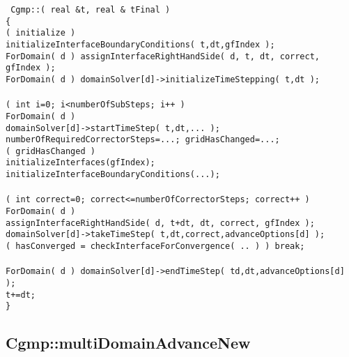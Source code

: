 \documentclass[11pt]{article}
\begin{document}
\begin{flushleft}\tt\small
Cgmp::( real \&t, real \& tFinal ) \\
\{  \\
\ia  \IF( initialize ) \\
\ib    initializeInterfaceBoundaryConditions( t,dt,gfIndex );\\
\ib    ForDomain( d ) assignInterfaceRightHandSide( d, t, dt, correct, gfIndex );\\
\ib    ForDomain( d ) domainSolver[d]->initializeTimeStepping( t,dt );\\
\ia  {}\\
\ia  \FOR( int i=0; i<numberOfSubSteps; i++ )\\
\ib    ForDomain( d )\\
\ic      domainSolver[d]->startTimeStep( t,dt,... );\\
\ic      numberOfRequiredCorrectorSteps=...; gridHasChanged=...; \\ 
\ib    \IF( gridHasChanged ) \\
\ic     initializeInterfaces(gfIndex); initializeInterfaceBoundaryConditions(...); \\
\ib \\
\ib    \FOR( int correct=0; correct<=numberOfCorrectorSteps; correct++ ) \\
\ic       ForDomain( d )\\
\id        assignInterfaceRightHandSide( d, t+dt, dt, correct, gfIndex );  \\
\id        domainSolver[d]->takeTimeStep( t,dt,correct,advanceOptions[d] );  \\
\ic      \IF( hasConverged = checkInterfaceForConvergence( .. ) ) break; \\
\ib \\
\ib    ForDomain( d ) domainSolver[d]->endTimeStep( td,dt,advanceOptions[d] ); \\
\ib    t+=dt;  \\
\}
\end{flushleft}

\clearpage
\subsection{Cgmp::multiDomainAdvanceNew}\label{sec:Cgmp::multiDomainAdvanceNew}
\end{document}
